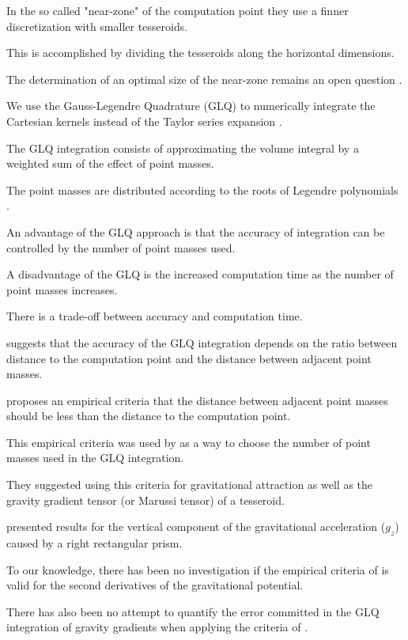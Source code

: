 \documentclass[paper,twocolumn]{geophysics}
\begin{document}
In the so called "near-zone" of the computation point they use a finner
discretization with smaller tesseroids.

This is accomplished by dividing the tesseroids along the horizontal
dimensions.

The determination of an optimal size of the near-zone remains an open question
\citep{Grombein2013}.

We use the Gauss-Legendre Quadrature (GLQ) to numerically integrate the Cartesian
kernels instead of the Taylor series expansion \citep{Asgharzadeh2007}.

The GLQ integration consists of approximating the volume integral by a weighted sum of
the effect of point masses.

The point masses are distributed according to the roots of Legendre polynomials
\citep{Hildebrand1987}.

An advantage of the GLQ approach is that the accuracy of integration can be
controlled by the number of point masses used.

A disadvantage of the GLQ is the increased computation time as the number of
point masses increases.

There is a trade-off between accuracy and computation time.

\citet{Ku1977} suggests that the accuracy of the GLQ integration depends on
the ratio between distance to the computation point and the distance between
adjacent point masses.

\citet{Ku1977} proposes an empirical criteria that the distance between adjacent
point masses should be less than the distance to the computation point.

This empirical criteria was used by \citet{Asgharzadeh2007} as a way to
choose the number of point masses used in the GLQ integration.

They suggested using this criteria for gravitational attraction as well as
the gravity gradient tensor (or Marussi tensor) of a tesseroid.

\citet{Ku1977} presented results for the vertical component of the
gravitational acceleration ($g_z$) caused by a right rectangular prism.

To our knowledge, there has been no investigation if the empirical criteria of
\citet{Ku1977} is valid for the second derivatives of the
gravitational potential.

There has also been no attempt to quantify the error committed in the GLQ
integration of gravity gradients when applying the criteria of \citet{Ku1977}.
\end{document}

